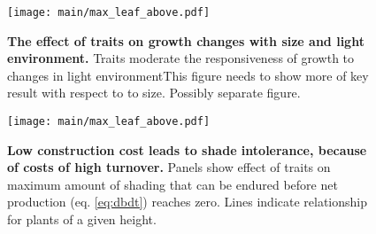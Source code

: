 \documentclass[12pt, a4paper]{article}
\makeatletter
\def\maxwidth{\ifdim\Gin@nat@width>\linewidth\linewidth
\else\Gin@nat@width\fi}
\let\Oldincludegraphics\includegraphics
\renewcommand{\includegraphics}[1]{\Oldincludegraphics[width=\maxwidth]{#1}}
\makeatother
\begin{document}
\newpage

\begin{figure}[ht]
\centering
\texttt{[image: main/max\_leaf\_above.pdf]}
\caption{\textbf{The effect of traits on growth changes with size and
light environment.} Traits moderate the responsiveness of growth to changes in light
environmentThis figure needs to show more of key result with respect to to size.
Possibly separate figure. \label{f-shifts}}
\end{figure}

\newpage

\begin{figure}[ht]
\centering
\texttt{[image: main/max\_leaf\_above.pdf]}
\caption{\textbf{Low construction cost leads to shade intolerance,
because of costs of high turnover.} Panels show effect of traits on
maximum amount of shading that can be endured before net production (eq.
\ref{eq:dbdt}) reaches zero. Lines indicate relationship for plants of a
given height. \label{f-wplcp}}
\end{figure}

\clearpage
\end{document}

